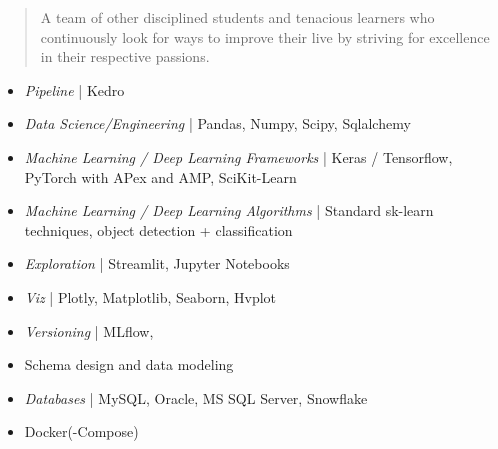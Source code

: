\documentclass[10pt,a4paper,ragged2e,withhyper]{altacv}
\begin{document}
\begin{paracol}{2}
\switchcolumn


\begin{quote}
\justify
A team of other disciplined students and tenacious learners who continuously look for ways to improve their live by striving for excellence in their respective passions.
\end{quote}


\begin{itemize}
\item \textit{{\faStream} Pipeline} | Kedro 
\item \textit{{\faAtom} Data Science/Engineering} | Pandas, Numpy, Scipy, Sqlalchemy
\item \textit{{\faProjectDiagram} Machine Learning / Deep Learning Frameworks} | Keras / Tensorflow, PyTorch with APex and AMP, SciKit-Learn
\item \textit{{\faBrain} Machine Learning / Deep Learning Algorithms} | Standard sk-learn techniques, object detection + classification 
\item \textit{{\faEye} Exploration} | Streamlit, Jupyter Notebooks
\item \textit{{\faChartPie} Viz} | Plotly, Matplotlib, Seaborn, Hvplot
\item \textit{{\faCodeBranch} Versioning} | MLflow, \faGit

\end{itemize}


\begin{itemize}
\item Schema design and data modeling
\item \textit{Databases} | MySQL, Oracle, MS SQL Server, Snowflake
\end{itemize}


\begin{itemize}
\item Docker(-Compose)
\end{itemize}


\end{paracol}
\end{document}
